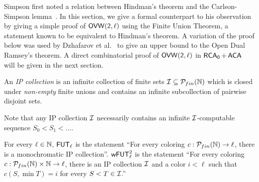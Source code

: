 
Simpson first noted a relation between Hindman's theorem and the Carlson-Simpson lemma~\cite{Carlson1984dual}. In this section, we give a formal counterpart to his observation by giving a simple proof of $\sf{OVW}(2,\ell)$ using the Finite Union Theorem, a statement known to be equivalent to Hindman's theorem. A variation of the proof below was used by Dzhafarov et al.~\cite{Dzhafarov2017Effectiveness} to give an upper bound to the Open Dual Ramsey's theorem. A direct combinatorial proof of $\sf{OVW}(2,\ell)$ in $\operatorname{\sf{RCA}_0} + \operatorname{\sf{ACA}}$ will be given in the next section. 

\begin{definition}
An \emph{IP collection} is an infinite collection of finite sets $\mathcal{I} \subseteq \mathcal{P}_{fin}(\mathbb{N})$
which is closed under \emph{non-empty} finite unions and contains an infinite subcollection
of pairwise disjoint sets.
\end{definition}

Note that any IP collection $\mathcal{I}$ necessarily contains an infinite $\mathcal{I}$-computable sequence $S_0 < S_1 < \dots$.

\begin{statement}
For every $\ell \in \mathbb{N}$, $\operatorname{\sf{FUT}}_\ell$ is the statement ``For every coloring $c : \mathcal{P}_{fin}(\mathbb{N}) \to \ell$,
there is a monochromatic IP collection''. $\operatorname{\sf{wFUT}}^2_\ell$ is the statement ``For every coloring $c : \mathcal{P}_{fin}(\mathbb{N}) \times \mathbb{N} \to \ell$,
there is an IP collection $\mathcal{I}$ and a color $i < \ell$ such that $c(S, \min T) = i$ for every $S < T \in \mathcal{I}$.''
\end{statement}


